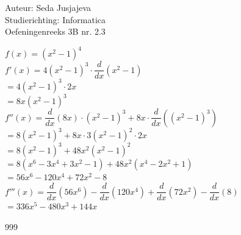 \documentclass[a4paper]{article}
\begin{document}
\noindent \large Auteur: Seda Jusjajeva\\
\noindent \large Studierichting: Informatica\\
\noindent \large Oefeningenreeks 3B nr. 2.3 \\

\medskip

\normalsize


$f(x) = (x^2 - 1)^4$ \\

$f'(x) = 4(x^2 - 1)^3\cdot\dfrac{d}{dx}(x^2 - 1)$ \\

$= 4(x^2 - 1)^3\cdot2x$ \\

$= 8x(x^2 - 1)^3$ \\

$f''(x) = \dfrac{d}{dx}(8x)\cdot(x^2 - 1)^3 + 8x\cdot\dfrac{d}{dx}\left((x^2 - 1)^3\right)$ \\

$= 8(x^2 - 1)^3 + 8x\cdot3(x^2 - 1)^2\cdot2x$ \\

$= 8(x^2 - 1)^3 + 48x^2(x^2 - 1)^2$ \\

$= 8(x^6 - 3x^4 + 3x^2 - 1) + 48x^2(x^4 - 2x^2 + 1)$ \\

$= 56x^6 -120x^4 + 72x^2 - 8$ \\

$f'''(x) = \dfrac{d}{dx}(56x^6) - \dfrac{d}{dx}(120x^4) + \dfrac{d}{dx}(72x^2) - \dfrac{d}{dx}(8)$ \\

$= 336x^5 - 480x^3 + 144x$ \\




\begin{thebibliography}{999}
\end{thebibliography}
\end{document}
